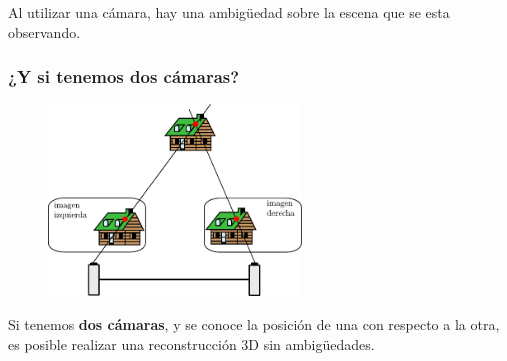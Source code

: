 \documentclass[compress]{beamer}
\begin{document}
\begin{frame}
	
	\begin{block}{}
		Al utilizar una cámara, hay una ambig\"{u}edad sobre la escena que se esta observando.
	\end{block}
	
\end{frame}


\begin{frame}
	\frametitle{¿Y si tenemos dos cámaras?}
	
	
	\begin{figure}[!h]
		\includegraphics[width=0.6\textwidth]{images/slam/stereoReconstruction}
	\end{figure}
	
	\begin{block}{}
		Si tenemos {\bf dos cámaras}, y se conoce la posición de una con respecto a la otra, es posible realizar una reconstrucción 3D sin ambig\"{u}edades.
	\end{block}
	
\end{frame}
\end{document}

